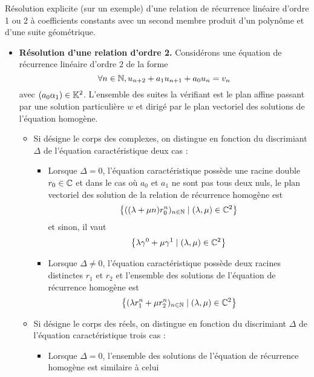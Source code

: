 \documentclass{article}
\begin{document}
\begin{question_kholle}{Résolution explicite (sur un exemple) d’une
		relation de récurrence linéaire d’ordre 1 ou 2 à coefficients
		constants avec un second membre produit d’un polynôme et d’une
		suite géométrique.}
\begin{itemize}
		\item \textbf{Résolution d’une relation d’ordre 2.}
		      Considérons une équation de récurrence linéaire d’ordre 2 de la forme
		      \[
			      \forall n\in\mathbb N, u_{n+2}+a_{1}u_{n+1}+a_{0}u_{n} = v_{n}
		      \]
		      avec $(a_{0}\alpha_{1})\in\mathbb K^{2}$. L’ensemble des suites la
		      vérifiant est le plan affine passant par une solution
		      particulière $w$ et dirigé par le plan vectoriel des solutions
		      de l’équation homogène.
		      \begin{itemize}
			      \item Si \K désigne le corps des complexes, on distingue en
			            fonction du discrimiant $\Delta$ de l’équation
			            caractéristique deux cas :
			            \begin{itemize}
				            \item Lorsque $\Delta=0$, l’équation caractéristique
				                  possède une racine double $r_{0}\in\mathbb C$ et dans le cas
				                  où $a_{0}$ et $a_{1}$ ne sont pas tous deux nuls, le
				                  plan vectoriel des solution de la relation de
				                  récurrence homogène est
				                  \[
					                  \left\{((\lambda+\mu n)r_{0}^{n})_{n\in\mathbb N} \mid
					                  (\lambda,\mu)\in\mathbb C^{2}\right\}
				                  \]
				                  et sinon, il vaut
				                  \[
					                  \left\{\lambda \gamma^{0} + \mu \gamma^{1} \mid
					                  (\lambda, \mu)\in\mathbb C^{2}\right\}
				                  \]
				            \item Lorsque $\Delta\neq 0$, l’équation caractéristique
				                  possède deux racines distinctes $r_{1}$ et $r_{2}$ et
				                  l’ensemble des solutions de l’équation de récurrence homogène est
				                  \[
					                  \left\{(\lambda r_{1}^{n}+ \mu r_{2}^{n})_{n\in\mathbb N}
					                  \mid (\lambda, \mu)\in\mathbb C^{2}\right\}
				                  \]
			            \end{itemize}
			      \item Si \K désigne le corps des réels, on distingue en
			            fonction du discrimiant $\Delta$ de l’équation
			            caractéristique trois cas :
			            \begin{itemize}
				            \item Lorsque $\Delta=0$, l’ensemble des solutions de
				                  l’équation de récurrence homogène est similaire à celui

\end{itemize}
\end{itemize}
\end{itemize}
\end{question_kholle}
\end{document}
